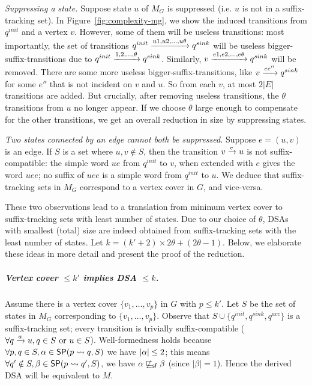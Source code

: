   \emph{Suppressing a state.} Suppose state $u$ of $M_G$
  is suppressed (i.e. $u$ is not in a suffix-tracking
  set). In Figure~\ref{fig:complexity-mg}, we show
  the induced transitions from $q^{init}$ and a vertex $v$. However,
  some of them will be useless transitions: most importantly, the set
  of transitions $q^{init} \xrightarrow{u1, u2, \dots, u\theta} q^{sink}$ will
  be useless bigger-suffix-transitions due to
  $q^{init} \xrightarrow{1, 2, \dots, \theta} q^{sink}$. Similarly,
  $v \xrightarrow{e1, e2, \dots, e\theta} q^{sink}$ will be removed. There are
  some more useless bigger-suffix-transitions, like
  $v \xrightarrow{e e''} q^{sink}$ for some $e''$ that is not incident on $v$
  and $u$. So from each $v$, at most $2 |E|$ transitions are
  added. But crucially, after removing
  useless transitions, the $\theta$ transitions from $u$
  no longer appear. If we choose $\theta$ large enough to compensate
  for the other transitions, we get an overall reduction in size by
  suppressing states.


 

  \emph{Two states connected by an edge cannot both be suppressed.}  Suppose $e = (u, v)$ is an edge. If $S$ is a set where
  $u, v \notin S$, then the transition $v \xrightarrow{e} u$ is not
  suffix-compatible: the simple word $ue$ from $q^{init}$ to $v$, when
  extended with $e$ gives the word $uee$; no suffix of $uee$ is a
  simple word from $q^{init}$ to $u$. We deduce that
  suffix-tracking sets in $M_G$ correspond to a vertex cover in $G$,
  and vice-versa.

  These two observations lead to a translation from minimum vertex
  cover to suffix-tracking sets with least number of states. Due to
  our choice of $\theta$, DSAs with smallest (total) size are indeed
  obtained from suffix-tracking sets with the least number of states. 
Let $k = (k' + 2) \times 2 \theta + (2 \theta - 1)$. Below, we elaborate these ideas in more detail and present the proof of the reduction.



\subparagraph*{Vertex cover $\le k'$ implies DSA $\le k$.}
Assume there is a vertex cover $\{v_1,
  \dots, v_p \}$ in $G$ with $p \le k'$. Let $S$ be the set of states in $M_G$ corresponding to $\{v_1,
  \dots, v_p \}$. Observe that $S \cup \{q^{init},q^{sink},q^{acc}\}$ is a suffix-tracking set; every transition is trivially suffix-compatible ($\forall q\xrightarrow{a}u, q\in S \text{ or } u\in S $). Well-formedness holds because $\forall p,q \in S, \alpha \in \mathsf{SP}(p \rightsquigarrow q, S)$ we have $|\alpha| \le 2$; this means $\forall q' \notin S, \beta \in \mathsf{SP}(p \rightsquigarrow q', S)$, we have
  $\alpha \not \sqsubseteq_{\mathsf {sf}} \beta$ (since $|\beta|=1$). Hence the derived DSA will be equivalent to $M$.

